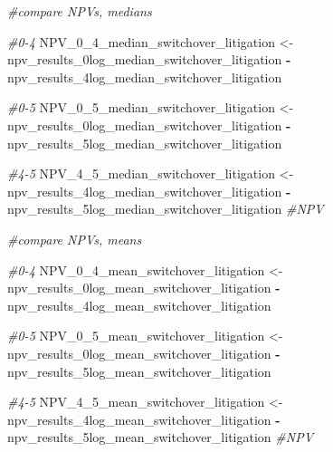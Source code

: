 \documentclass[
]{article}
\newenvironment{Shaded}{\begin{snugshade}}{\end{snugshade}}
\newcommand{\CommentTok}[1]{\textcolor[rgb]{0.56,0.35,0.01}{\textit{#1}}}
\newcommand{\NormalTok}[1]{#1}
\newcommand{\OtherTok}[1]{\textcolor[rgb]{0.56,0.35,0.01}{#1}}
\newcommand{\SpecialCharTok}[1]{\textcolor[rgb]{0.81,0.36,0.00}{\textbf{#1}}}
\begin{document}
\begin{Shaded}
\begin{Highlighting}[]
\CommentTok{\#compare NPVs, medians}

\CommentTok{\#0{-}4}
\NormalTok{NPV\_0\_4\_median\_switchover\_litigation }\OtherTok{\textless{}{-}}\NormalTok{ npv\_results\_0log\_median\_switchover\_litigation }\SpecialCharTok{{-}}\NormalTok{ npv\_results\_4log\_median\_switchover\_litigation}


\CommentTok{\#0{-}5}
\NormalTok{NPV\_0\_5\_median\_switchover\_litigation }\OtherTok{\textless{}{-}}\NormalTok{ npv\_results\_0log\_median\_switchover\_litigation }\SpecialCharTok{{-}}\NormalTok{ npv\_results\_5log\_median\_switchover\_litigation}


\CommentTok{\#4{-}5}
\NormalTok{NPV\_4\_5\_median\_switchover\_litigation }\OtherTok{\textless{}{-}}\NormalTok{ npv\_results\_4log\_median\_switchover\_litigation }\SpecialCharTok{{-}}\NormalTok{ npv\_results\_5log\_median\_switchover\_litigation }\CommentTok{\#NPV}


\CommentTok{\#compare NPVs, means}

\CommentTok{\#0{-}4}
\NormalTok{NPV\_0\_4\_mean\_switchover\_litigation }\OtherTok{\textless{}{-}}\NormalTok{ npv\_results\_0log\_mean\_switchover\_litigation }\SpecialCharTok{{-}}\NormalTok{ npv\_results\_4log\_mean\_switchover\_litigation}


\CommentTok{\#0{-}5}
\NormalTok{NPV\_0\_5\_mean\_switchover\_litigation }\OtherTok{\textless{}{-}}\NormalTok{ npv\_results\_0log\_mean\_switchover\_litigation }\SpecialCharTok{{-}}\NormalTok{ npv\_results\_5log\_mean\_switchover\_litigation}



\CommentTok{\#4{-}5}
\NormalTok{NPV\_4\_5\_mean\_switchover\_litigation }\OtherTok{\textless{}{-}}\NormalTok{ npv\_results\_4log\_mean\_switchover\_litigation }\SpecialCharTok{{-}}\NormalTok{ npv\_results\_5log\_mean\_switchover\_litigation }\CommentTok{\#NPV}
\end{Highlighting}
\end{Shaded}
\end{document}
